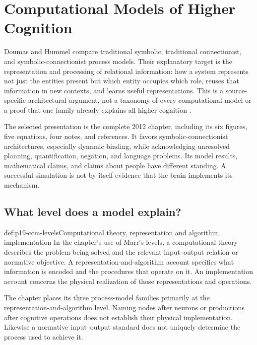\chapter{Computational Models of Higher Cognition}
\label{sec:p19-computational-cognitive-models}

Doumas and Hummel compare traditional symbolic, traditional connectionist,
and symbolic-connectionist process models. Their explanatory target is
the representation and processing of relational information: how a system
represents not just the entities present but which entity occupies which
role, reuses that information in new contexts, and learns useful
representations. This is a source-specific architectural argument, not
a taxonomy of every computational model or a proof that one family
already explains all higher cognition
\parencite[pp.~52--64]{DoumasHummel2012HigherCognition}.

The selected presentation is the complete 2012 chapter, including its
six figures, five equations, four notes, and references. It favors
symbolic-connectionist architectures, especially dynamic binding, while
acknowledging unresolved planning, quantification, negation, and language
problems. Its model results, mathematical claims, and claims about people
have different standing. A successful simulation is not by itself evidence
that the brain implements its mechanism.

\section{What level does a model explain?}
\label{sec:p19-ccm-levels}

\begin{hbdefinition}{def:p19-ccm-levels}{Computational theory, representation and algorithm, implementation}
In the chapter's use of Marr's levels, a computational theory describes
the problem being solved and the relevant input--output relation or
normative objective. A representation-and-algorithm account specifies
what information is encoded and the procedures that operate on it.
An implementation account concerns the physical realization of those
representations and operations.

The chapter places its three process-model families primarily at the
representation-and-algorithm level. Naming nodes after neurons or
productions after cognitive operations does not establish their physical
implementation. Likewise a normative input--output standard does not
uniquely determine the process used to achieve it.
\end{hbdefinition}

